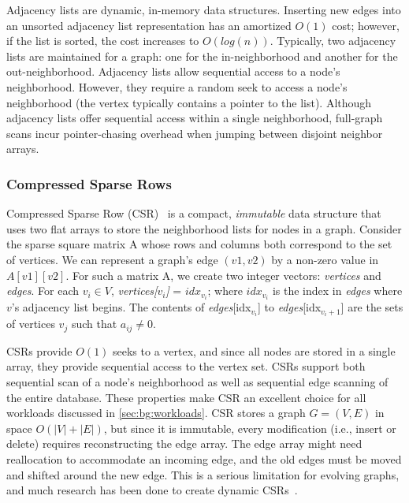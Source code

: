 Adjacency lists are dynamic, in-memory data structures. Inserting new edges into an unsorted adjacency list representation has an amortized $O(1)$ cost; however, if the list is sorted, the cost increases to $O(log(n))$.
Typically, two adjacency lists are maintained for a graph: one for the in-neighborhood and another for the out-neighborhood.
Adjacency lists allow sequential access to a node's neighborhood. However, they require a random seek to access a node's neighborhood (the vertex typically contains a pointer to the list).
Although adjacency lists offer sequential access within a single neighborhood, full-graph scans incur pointer-chasing overhead when jumping between disjoint neighbor arrays.

\subsubsection{Compressed Sparse Rows}
\label{sec:bg:reps:csr}
Compressed Sparse Row (CSR)~\cite{saad2003iterative} is a compact, \emph{immutable} data structure that uses two flat arrays to store the neighborhood lists for nodes in a graph.
Consider the sparse square matrix A whose rows and columns both correspond to the set of vertices. We can represent a graph's edge $(v1, v2)$ by a non-zero value in $A[v1][v2]$.
For such a matrix A, we create two integer vectors: \emph{vertices} and \emph{edges}.
For each $v_i \in V$, \emph{vertices[$v_i$]} = $idx_{v_i}$; where $idx_{v_i}$ is the index in \emph{edges} where $v$'s adjacency list begins.
The contents of \emph{edges}[idx$_{v_i}$] to \emph{edges}[idx$_{v_i+1}$] are the sets of vertices $v_j$ such that $a_{ij} \neq 0$.

CSRs provide $O(1)$ seeks to a vertex, and since all nodes are stored in a single array, they provide sequential access to the vertex set.
CSRs support both sequential scan of a node's neighborhood as well as sequential edge scanning of the entire database.
These properties make CSR an excellent choice for all workloads discussed in \autoref{sec:bg:workloads}.
CSR stores a graph $G = (V, E)$ in space $O(|V| + |E|)$, but since it is immutable, every modification (i.e., insert or delete) requires reconstructing the edge array.
The edge array might need reallocation to accommodate an incoming edge, and the old edges must be moved and shifted around the new edge.
This is a serious limitation for evolving graphs, and much research has been done to create dynamic CSRs~\cite{staudt2014networkit, PackedCSR, csr++2020Firmli, llama, madduri2009compact}.

